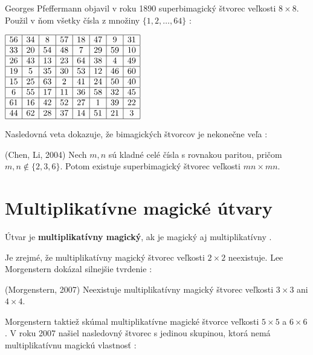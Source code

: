 Georges Pfeffermann objavil v roku 1890 superbimagický štvorec veľkosti $8 \times 8$. Použil v ňom všetky čísla z množiny $\{1, 2, \dots , 64\}$ \cite{multimagie}:

\begin{center}
$\begin{array}{ |c|c|c|c|c|c|c|c| }
\hline
56 & 34 & 8 & 57 & 18 & 47 & 9 & 31 \\ 
\hline
33 & 20 & 54 & 48 & 7 & 29 & 59 & 10 \\ 
\hline
26 & 43 & 13 & 23 & 64 & 38 & 4 & 49 \\ 
\hline
19 & 5 & 35 & 30 & 53 & 12 & 46 & 60 \\ 
\hline
15 & 25 & 63 & 2 & 41 & 24 & 50 & 40 \\ 
\hline
6 & 55 & 17 & 11 & 36 & 58 & 32 & 45 \\ 
\hline
61 & 16 & 42 & 52 & 27 & 1 & 39 & 22 \\ 
\hline
44 & 62 & 28 & 37 & 14 & 51 & 21 & 3 \\ 
\hline
\end{array}$
\end{center}

Nasledovná veta dokazuje, že bimagických štvorcov je nekonečne veľa \cite{bimagic}:

\begin{theorem} (Chen, Li, 2004) Nech $m,n$ sú kladné celé čísla s rovnakou paritou, pričom $m,n \notin \{2,3,6\}$. Potom existuje superbimagický štvorec veľkosti $mn \times mn$.
\end{theorem}

\section{Multiplikatívne magické útvary}
\begin{definition} Útvar je \textbf{multiplikatívny magický}, ak je magický aj multiplikatívny \cite{multimagie}.
\end{definition}

Je zrejmé, že multiplikatívny magický štvorec veľkosti $2 \times 2$ neexistuje. Lee Morgenstern dokázal silnejšie tvrdenie \cite{multimagie}:

\begin{theorem} (Morgenstern, 2007) Neexistuje multiplikatívny magický štvorec veľkosti $3 \times 3$ ani $4 \times 4$.
\end{theorem}

Morgenstern taktiež skúmal multiplikatívne magické štvorce veľkosti $5 \times 5$ a $6 \times 6$. V roku 2007 našiel nasledovný štvorec s jedinou skupinou, ktorá nemá multiplikatívnu magickú vlastnosť \cite{multimagie}:

